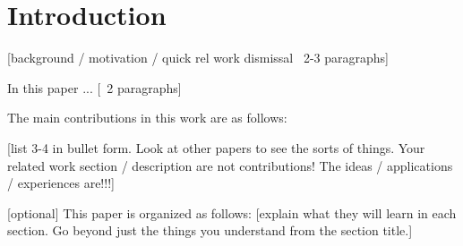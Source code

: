 \section{Introduction}
\label{SEC:introduction}

[background / motivation / quick rel work dismissal ~2-3 paragraphs]

In this paper ... [~2 paragraphs]

The main contributions in this work are as follows:

[list 3-4 in bullet form.  Look at other papers to see the sorts of things.
Your related work section / description are not contributions!  The ideas /
applications / experiences are!!!]


[optional]
This paper is organized as follows: [explain what they will learn in each
section.  Go beyond just the things you understand from the section title.]

